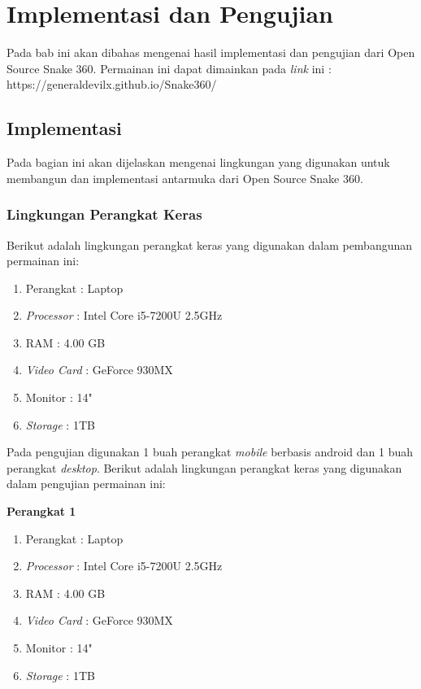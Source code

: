 \chapter{Implementasi dan Pengujian}
\label{chap:implementasipengujian}

Pada bab ini akan dibahas mengenai hasil implementasi dan pengujian dari Open Source Snake 360. Permainan ini dapat dimainkan pada \textit{link} ini : https://generaldevilx.github.io/Snake360/

\section{Implementasi}
Pada bagian ini akan dijelaskan mengenai lingkungan yang digunakan untuk membangun dan implementasi antarmuka dari Open Source Snake 360.

\subsection{Lingkungan Perangkat Keras}
Berikut adalah lingkungan perangkat keras yang digunakan dalam pembangunan permainan ini: 

\begin{enumerate}
	\item Perangkat : Laptop
	\item \textit{Processor} : Intel Core i5-7200U 2.5GHz
	\item RAM : 4.00 GB
	\item \textit{Video Card} : GeForce 930MX
	\item Monitor : 14"
	\item \textit{Storage} : 1TB
\end{enumerate}

Pada pengujian digunakan 1 buah perangkat \textit{mobile} berbasis android dan 1 buah perangkat \textit{desktop}. Berikut adalah lingkungan perangkat keras yang digunakan dalam pengujian permainan ini:

\textbf{Perangkat 1}\\
\begin{enumerate}
	\item Perangkat : Laptop
	\item \textit{Processor} : Intel Core i5-7200U 2.5GHz
	\item RAM : 4.00 GB
	\item \textit{Video Card} : GeForce 930MX
	\item Monitor : 14"
	\item \textit{Storage} : 1TB
\end{enumerate}

